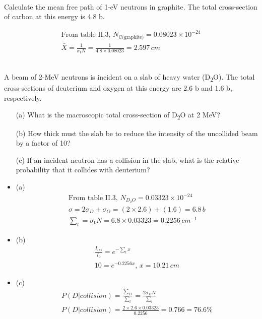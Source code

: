 \documentclass{homework}
\begin{document}
\question \\
Calculate the mean free path of 1-eV neutrons in graphite. The total cross-section of
carbon at this energy is 4.8 b.

\begin{sol}
  \begin{gather*}
  \text{From table II.3, } N_{\text{C(graphite)}} = 0.08023\times 10^{-24} \\
  \bar{X} = \frac{1}{\sigma_{\text{t}} N} = \frac{1}{4.8 \times 0.08023} = 2.597\,cm
  \end{gather*}

\end{sol}

\question \\
A beam of 2-MeV neutrons is incident on a slab of heavy water (D\textsubscript{2}O). The total cross-sections of deuterium and oxygen at this energy are 2.6 b and 1.6 b, respectively.

\begin{enumerate}
    \item[(a)] What is the macroscopic total cross-section of D\textsubscript{2}O at 2 MeV?
    \item[(b)] How thick must the slab be to reduce the intensity of the uncollided beam by a factor of 10?
    \item[(c)] If an incident neutron has a collision in the slab, what is the relative probability that it collides with deuterium?
\end{enumerate}

\begin{sol}
  \begin{itemize}
    \item{(a)} 
      \begin{gather*}
      \text{From table II.3, } N_{D_{2}O} = 0.03323\times 10^{-24} \\
      \sigma = 2\sigma_{D} + \sigma_{O} = (2\times 2.6) + (1.6) = 6.8\,b\\
      \textstyle \sum_{t} = \sigma_{\text{t}}N = 6.8 \times 0.03323 = 0.2256\,cm^{-1}
      \end{gather*}
    \item{(b)}
    \begin{gather*}
    \frac{I_{\text{(x)}}}{I_{0}} = e^{-\textstyle \sum_{t}x} \\
    10 = e^{-0.2256x} \text{, } x = 10.21\,cm
    \end{gather*}
    \item{(c)}
    \begin{gather*}
     P(D|collision) = \frac{\textstyle \sum_{D}}{\textstyle \sum_{t}} = \frac{2\sigma_{D}N}{\textstyle \sum_{t}} \\
     P(D|collision) = \frac{2\times 2.6\times 0.03323 }{0.2256} = 0.766 = 76.6\%
    \end{gather*}
    \end{itemize}
  \end{sol}
\end{document}
